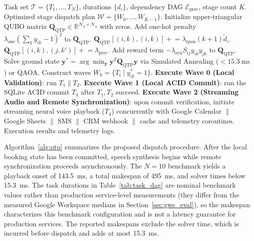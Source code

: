 \documentclass[review,12pt,times,authoryear]{elsarticle}
\theoremstyle{definition}
\begin{document}
\begin{algorithm}[t]
\caption{Quantum Task Parallelization (QTP) Live Scheduling}
\label{alg:qtp}
\begin{algorithmic}[1]
\Require Task set $\mathcal{T} = \{T_1, \dots, T_N\}$, durations $\{d_i\}$, dependency DAG $\mathcal{E}_{\text{prec}}$, stage count $K$.
\Ensure Optimized stage dispatch plan $\mathcal{W} = \{W_0, \dots, W_{K-1}\}$.
\State Initialize upper-triangular QUBO matrix $\mathbf{Q}_{\text{QTP}} \in \mathbb{R}^{\mathcal{N}_q \times \mathcal{N}_q}$ with zeros.
  \State Add one-hot penalty $\lambda_{\text{one}} (\sum_k y_{ik} - 1)^2$ to $\mathbf{Q}_{\text{QTP}}$.
    \State $\mathbf{Q}_{\text{QTP}}[(i,k),(i,k)] \mathrel{+}= \lambda_{\text{span}} (k+1) \tilde{d}_i$.
  \EndFor
\EndFor
{}
      \State $\mathbf{Q}_{\text{QTP}}[(i,k),(j,k')] \mathrel{+}= \lambda_{\text{prec}}$.
    \EndFor
  \EndFor
\EndFor
{}
  \State Add reward term $-\lambda_{\text{syn}} S_{ij} y_{ik}y_{jk}$ to $\mathbf{Q}_{\text{QTP}}$.
\EndFor
\State Solve ground state $\bm{y}^* = \arg\min_{\bm{y}} \bm{y}^T \mathbf{Q}_{\text{QTP}} \bm{y}$ via Simulated Annealing ($< \SI{15.3}{\milli\second}$) or QAOA.
\State Construct waves $W_k = \{ T_i \mid y_{ik}^* = 1 \}$.
\State \textbf{Execute Wave 0 (Local Validation)}: run $T_1 \parallel T_2$.
\State \textbf{Execute Wave 1 (Local ACID Commit)}: run the SQLite ACID commit $T_3$ after $T_1, T_2$ succeed.
\State \textbf{Execute Wave 2 (Streaming Audio and Remote Synchronization)}: upon commit verification, initiate streaming neural voice playback ($T_4$) concurrently with Google Calendar $\parallel$ Google Sheets $\parallel$ SMS $\parallel$ CRM webhook $\parallel$ cache and telemetry coroutines.
\State \Return Execution results and telemetry logs.
\end{algorithmic}
\end{algorithm}

Algorithm~\ref{alg:qtp} summarizes the proposed dispatch procedure. After the local booking state has been committed, speech synthesis begins while remote synchronization proceeds asynchronously. The $N=10$ benchmark yields a playback onset of \SI{143.5}{\milli\second}, a total makespan of \SI{495}{\milli\second}, and solver times below \SI{15.3}{\milli\second}. The task durations in Table~\ref{tab:task_dag} are nominal benchmark values rather than production service-level measurements (they differ from the measured Google Workspace medians in Section~\ref{sec:gws_eval}), so the makespan characterizes this benchmark configuration and is not a latency guarantee for production services. The reported makespans exclude the solver time, which is incurred before dispatch and adds at most \SI{15.3}{\milli\second}.
\end{document}
